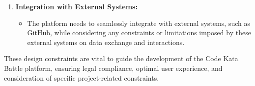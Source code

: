 \begin{enumerate}
    \item \textbf{Integration with External Systems:}
          \begin{itemize}
              \item The platform needs to seamlessly integrate with external systems, such as GitHub, while considering any constraints or limitations imposed by these external systems on data exchange and interactions.
          \end{itemize}
\end{enumerate}

These design constraints are vital to guide the development of the Code Kata Battle platform, ensuring legal compliance, optimal user experience, and consideration of specific project-related constraints.
